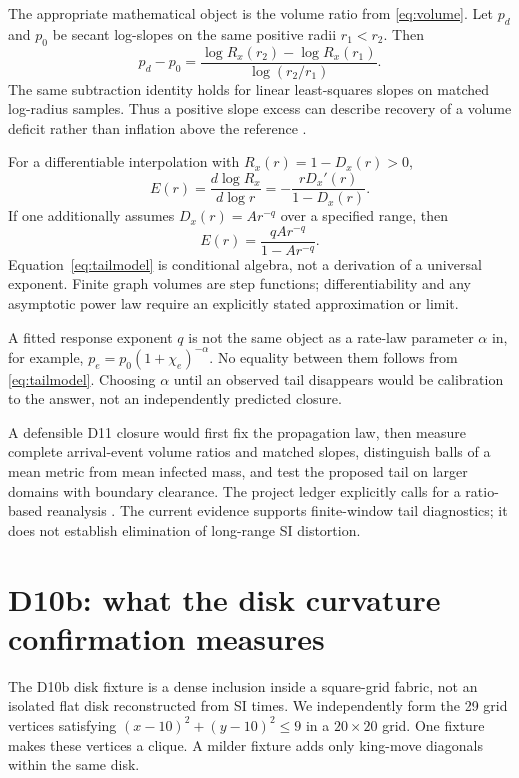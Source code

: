 \documentclass[11pt,letterpaper]{article}
\theoremstyle{definition}
\theoremstyle{remark}
\begin{document}
The appropriate mathematical object is the volume ratio from \eqref{eq:volume}. Let $p_d$ and $p_0$ be secant log-slopes on the same positive radii $r_1<r_2$. Then
\begin{equation}
 p_d-p_0=
 \frac{\log R_x(r_2)-\log R_x(r_1)}{\log(r_2/r_1)}.
 \label{eq:ratioidentity}
\end{equation}
The same subtraction identity holds for linear least-squares slopes on matched log-radius samples. Thus a positive slope excess can describe recovery of a volume deficit rather than inflation above the reference \cite{leblond2026a}.

For a differentiable interpolation with $R_x(r)=1-D_x(r)>0$,
\begin{equation}
 E(r)=\frac{d\log R_x}{d\log r}
 =-\frac{rD_x'(r)}{1-D_x(r)}.
 \label{eq:deficit}
\end{equation}
If one additionally assumes $D_x(r)=Ar^{-q}$ over a specified range, then
\begin{equation}
 E(r)=\frac{qAr^{-q}}{1-Ar^{-q}}.
 \label{eq:tailmodel}
\end{equation}
Equation~\eqref{eq:tailmodel} is conditional algebra, not a derivation of a universal exponent. Finite graph volumes are step functions; differentiability and any asymptotic power law require an explicitly stated approximation or limit.

A fitted response exponent $q$ is not the same object as a rate-law parameter $\alpha$ in, for example, $p_e=p_0(1+\chi_e)^{-\alpha}$. No equality between them follows from \eqref{eq:tailmodel}. Choosing $\alpha$ until an observed tail disappears would be calibration to the answer, not an independently predicted closure.

A defensible D11 closure would first fix the propagation law, then measure complete arrival-event volume ratios and matched slopes, distinguish balls of a mean metric from mean infected mass, and test the proposed tail on larger domains with boundary clearance. The project ledger explicitly calls for a ratio-based reanalysis \cite{leblondLedger}. The current evidence supports finite-window tail diagnostics; it does not establish elimination of long-range SI distortion.

\section{D10b: what the disk curvature confirmation measures}\label{sec:disk}
The D10b disk fixture is a dense inclusion inside a square-grid fabric, not an isolated flat disk reconstructed from SI times. We independently form the 29 grid vertices satisfying $(x-10)^2+(y-10)^2\leq9$ in a $20\times20$ grid. One fixture makes these vertices a clique. A milder fixture adds only king-move diagonals within the same disk.
\end{document}
